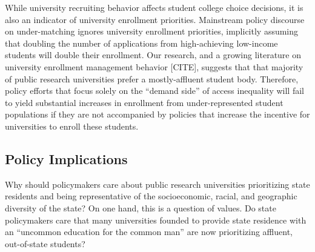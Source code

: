 \documentclass[twoside]{article}
\begin{document}
While university recruiting behavior affects student college choice decisions, it is also an indicator of university enrollment priorities.  Mainstream policy discourse on under-matching ignores university enrollment priorities, implicitly assuming that doubling the number of applications from high-achieving low-income students will double their enrollment. Our research, and a growing literature on university enrollment management behavior [CITE], suggests that that majority of public research universities prefer a mostly-affluent student body. Therefore, policy efforts that focus solely on the ``demand side'' of access inequality will fail to yield substantial increases in enrollment from under-represented student populations if they are not accompanied by policies that increase the incentive for universities to enroll these students.

\subsection*{Policy Implications}


Why should policymakers care about public research universities prioritizing state residents and being representative of the socioeconomic, racial, and geographic diversity of the state? On one hand, this is a question of values.  Do state policymakers care that many universities founded to provide state residence with an ``uncommon education for the common man'' are now prioritizing affluent, out-of-state students? 
\end{document}
